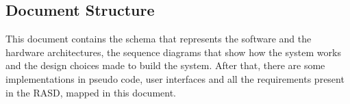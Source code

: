 \subsection{Document Structure}
	This document contains the schema that represents the software and the hardware architectures, the sequence diagrams that show how the system works and the design choices made to build the system. After that, there are some implementations in pseudo code, user interfaces and all the requirements present in the RASD, mapped in this document.